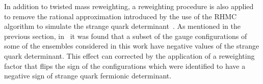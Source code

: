 In addition to twisted mass reweighting, a reweighting procedure is also applied to remove the rational approximation introduced by the use of the RHMC algorithm to simulate the strange quark determinant~\citep{Kennedy:1998cu,Clark:2006fx}. As mentioned in the previous section, in~\citep{Mohler:2020txx} it was found that a subset of the gauge configurations of some of the ensembles considered in this work have negative values of the strange quark determinant. This effect can corrected by the application of a reweighting factor that flips the sign of the configurations which were identified to have a negative sign of strange quark fermionic determinant. 



